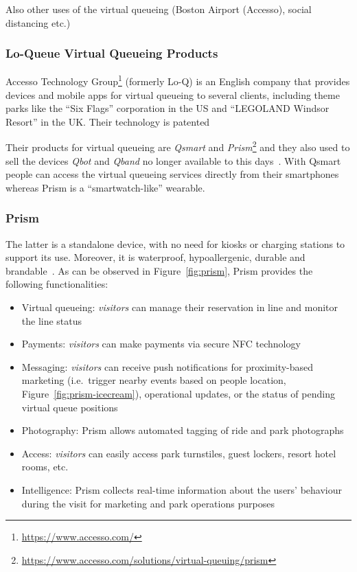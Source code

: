 Also other uses of the virtual queueing (Boston Airport (Accesso), social distancing etc.)

\subsubsection{Lo-Queue Virtual Queueing Products}
Accesso Technology Group\footnote{\url{https://www.accesso.com/}} (formerly Lo-Q) is an English company that provides
devices and mobile apps for virtual queueing to several clients, including theme parks like the ``Six Flags'' corporation in the US
and ``LEGOLAND Windsor Resort'' in the UK\@.
Their technology is patented %

Their products for virtual queueing are \textit{Qsmart} and \textit{Prism}\footnote{\url{https://www.accesso.com/solutions/virtual-queuing/prism}}
and they also used to sell the devices \textit{Qbot} and \textit{Qband} no longer available to this days~\cite{accesso-wikipedia}.
With Qsmart people can access the virtual queueing services directly from their smartphones whereas Prism is a ``smartwatch-like''
wearable.

\subsubsection*{Prism}
The latter is a standalone device, with no need for kiosks or charging stations to support its use.
Moreover, it is waterproof, hypoallergenic, durable and brandable~\cite{prism-desc}.
As can be observed in Figure~\ref{fig:prism}, Prism provides the following functionalities:
\begin{itemize}
    \item Virtual queueing: \textit{visitors} can manage their reservation in line and monitor the line status
    \item Payments: \textit{visitors} can make payments via secure NFC technology
    \item Messaging: \textit{visitors} can receive push notifications for proximity-based marketing (i.e.\ trigger nearby events based on people location, Figure~\ref{fig:prism-icecream}), operational updates, or the status of pending virtual queue positions
    \item Photography: Prism allows automated tagging of ride and park photographs
    \item Access: \textit{visitors} can easily access park turnstiles, guest lockers, resort hotel rooms, etc.
    \item Intelligence: Prism collects real-time information about the users' behaviour during the visit for marketing and park operations purposes
\end{itemize}

